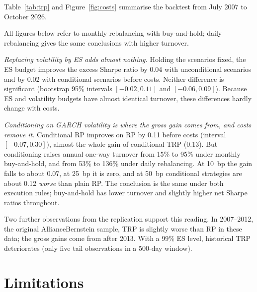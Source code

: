 \documentclass[11pt]{article}
\newcommand{\1}{\mathbf{1}}
\begin{document}
Table~\ref{tab:trp} and Figure~\ref{fig:costs} summarise the backtest from July 2007 to October 2026.

All figures below refer to monthly rebalancing with buy-and-hold; daily rebalancing gives the same
conclusions with higher turnover.

\emph{Replacing volatility by ES adds almost nothing.} Holding the scenarios fixed, the ES budget improves
the excess Sharpe ratio by 0.04 with unconditional scenarios and by 0.02 with conditional scenarios before
costs. Neither difference is significant (bootstrap 95\% intervals $[-0.02,0.11]$ and $[-0.06,0.09]$). Because ES and
volatility budgets have almost identical turnover, these differences hardly change with costs.

\emph{Conditioning on GARCH volatility is where the gross gain comes from, and costs remove it.}
Conditional RP improves on RP by 0.11 before costs (interval $[-0.07,0.30]$), almost the whole gain of conditional TRP
(0.13). But conditioning raises annual one-way turnover from 15\% to 95\% under monthly buy-and-hold, and
from 53\% to 136\% under daily rebalancing. At 10~bp the gain falls to about 0.07, at 25~bp it is zero, and
at 50~bp conditional strategies are about 0.12 \emph{worse} than plain RP. The conclusion is the same under
both execution rules; buy-and-hold has lower turnover and slightly higher net Sharpe ratios throughout.

Two further observations from the replication support this reading. In 2007--2012, the original
AllianceBernstein sample, TRP is slightly worse than RP in these data; the gross gains come from after 2013.
With a 99\% ES level, historical TRP deteriorates (only five tail observations in a 500-day window).

\section{Limitations}
\end{document}
